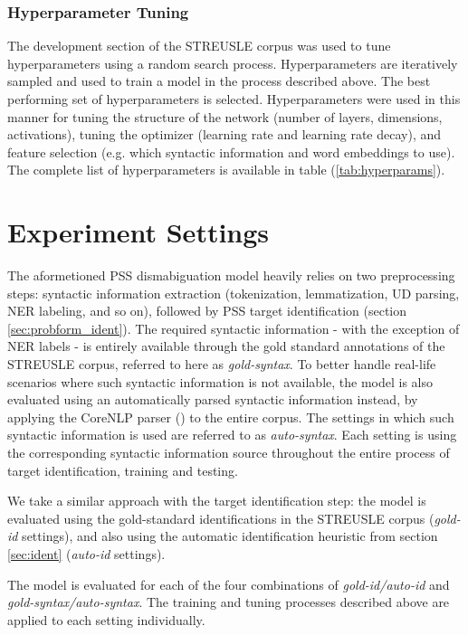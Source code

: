\subsubsection{Hyperparameter Tuning}

The development section of the STREUSLE corpus was used to tune hyperparameters using a random search process. Hyperparameters are iteratively sampled and used to train a model in the process described above. The best performing set of hyperparameters is selected. Hyperparameters were used in this manner for tuning the structure of the network (number of layers, dimensions, activations), tuning the optimizer (learning rate and learning rate decay), and feature selection (e.g. which syntactic information and word embeddings to use). The complete list of hyperparameters is available in table (\ref{tab:hyperparams}).

\section{Experiment Settings} \label{sec:psssettings}

The aformetioned PSS dismabiguation model heavily relies on two preprocessing steps: syntactic information extraction (tokenization, lemmatization, UD parsing, NER labeling, and so on), followed by PSS target identification (section \ref{sec:probform_ident}). The required syntactic information - with the exception of NER labels - is entirely available through the gold standard annotations of the STREUSLE corpus, referred to here as \textit{gold-syntax}. To better handle real-life scenarios where such syntactic information is not available, the model is also evaluated using an automatically parsed syntactic information instead, by applying the CoreNLP parser (\cite{manning14stanford}) to the entire corpus. The settings in which such syntactic information is used are referred to as \textit{auto-syntax}. Each setting is using the corresponding syntactic information source throughout the entire process of target identification, training and testing. 

We take a similar approach with the target identification step: the model is evaluated using the gold-standard identifications in the STREUSLE corpus (\textit{gold-id} settings), and also using the automatic identification heuristic from section \ref{sec:ident} (\textit{auto-id} settings).

The model is evaluated for each of the four combinations of \textit{gold-id/auto-id} and \textit{gold-syntax/auto-syntax}. The training and tuning processes described above are applied to each setting individually.

